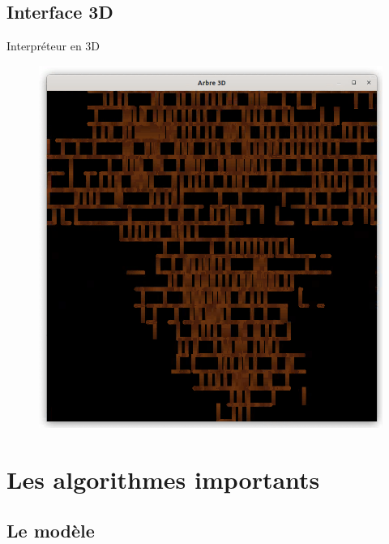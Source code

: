 \documentclass{beamer}
\begin{document}
\subsection{Interface 3D}

\begin{frame}

	\begin{block}{Interpréteur en 3D}
	\begin{figure}[h]
	\includegraphics[scale=0.28]{images/interface3D.png}
	\end{figure}

	\end{block}

\end{frame}




\section{Les algorithmes importants}
\subsection{Le modèle}
\end{document}
